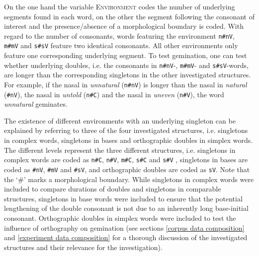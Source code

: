   
  On the one hand the variable \textsc{Environment} codes the number of underlying segments found in each word, on the other the segment following the consonant of interest and the presence/absence of a morphological boundary is coded.  With regard to the number of consonants,  words featuring the environment \texttt{n\#nV}, \texttt{ m\#mV} and \texttt{s\#sV} feature two identical consonants. All other environments only feature one corresponding underlying segment. 
  To test gemination, one can test whether underlying doubles, i.e. the consonants in \texttt{n\#nV}-,  \texttt{m\#mV}- and \texttt{s\#sV}-words, are longer than the corresponding singletons in the other investigated structures. For example, if the nasal in \textit{unnatural} (\texttt{n\#nV}) is longer than the nasal in \textit{natural} (\texttt{\#nV}), the nasal in \textit{untold} (\texttt{n\#C}) and the nasal in \textit{uneven} (\texttt{n\#V}), the word \textit{unnatural} geminates.
  
  The existence of different environments with an underlying singleton can be explained by referring to three of the four investigated structures, i.e. singletons in complex words, singletons in bases and orthographic doubles in simplex words. The different levels represent the three different structures, i.e. singletons in complex words are coded as \texttt{n\#C}, \texttt{n\#V}, \texttt{m\#C}, \texttt{s\#C} and \texttt{s\#V} , singletons in bases are coded as \texttt{\#nV}, \texttt{\#mV} and \texttt{\#sV}, and orthographic doubles are coded as \texttt{sV}. Note that the `\#' marks a morphological boundary.
  While singletons in complex words were included to compare durations of doubles and singletons in comparable structures, singletons in base words were included to ensure that the potential lengthening of the double consonant is not due to an inherently long base-initial consonant. Orthographic doubles in simplex words were included to test the influence of orthography on gemination (see sections \ref{corpus data composition} and \ref{experiment data composition} for a thorough discussion of the investigated structures and their relevance for the investigation).
  
  

